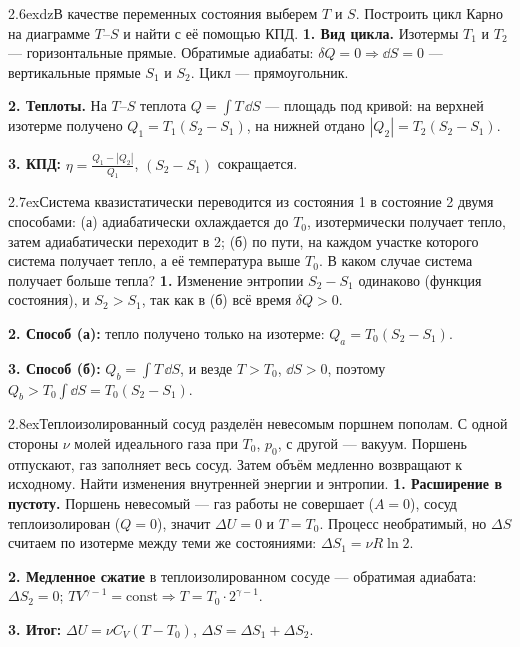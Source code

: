 \begin{problem}{2.6}{exdz}{В качестве переменных состояния выберем $T$ и $S$. Построить цикл Карно на диаграмме $T$--$S$ и найти с её помощью КПД.}
\textbf{1. Вид цикла.} Изотермы $T_1$ и $T_2$ — горизонтальные прямые. Обратимые адиабаты: $\delta Q=0\Rightarrow\dd S=0$ — вертикальные прямые $S_1$ и $S_2$.
Цикл — прямоугольник.

\textbf{2. Теплоты.} На $T$--$S$ теплота $Q=\int T\,\dd S$ — площадь под кривой:
на верхней изотерме получено $Q_1=T_1(S_2-S_1)$, на нижней отдано $|Q_2|=T_2(S_2-S_1)$.

\textbf{3. КПД:} $\eta=\frac{Q_1-|Q_2|}{Q_1}$, $(S_2-S_1)$ сокращается.
\end{problem}

\begin{problem}{2.7}{ex}{Система квазистатически переводится из состояния 1 в состояние 2 двумя способами: (а) адиабатически охлаждается до $T_0$,
изотермически получает тепло, затем адиабатически переходит в 2; (б) по пути, на каждом участке которого система получает тепло, а её температура выше $T_0$.
В каком случае система получает больше тепла?}
\textbf{1.} Изменение энтропии $S_2-S_1$ одинаково (функция состояния), и $S_2>S_1$, так как в (б) всё время $\delta Q>0$.

\textbf{2. Способ (а):} тепло получено только на изотерме: $Q_a=T_0(S_2-S_1)$.

\textbf{3. Способ (б):} $Q_b=\int T\,\dd S$, и везде $T>T_0$, $\dd S>0$, поэтому $Q_b>T_0\int\dd S=T_0(S_2-S_1)$.
\end{problem}

\begin{problem}{2.8}{ex}{Теплоизолированный сосуд разделён невесомым поршнем пополам. С одной стороны $\nu$ молей идеального газа при $T_0$, $p_0$,
с другой — вакуум. Поршень отпускают, газ заполняет весь сосуд. Затем объём медленно возвращают к исходному. Найти изменения внутренней энергии и энтропии.}
\textbf{1. Расширение в пустоту.} Поршень невесомый — газ работы не совершает ($A=0$), сосуд теплоизолирован ($Q=0$), значит $\Delta U=0$ и $T=T_0$.
Процесс необратимый, но $\Delta S$ считаем по изотерме между теми же состояниями: $\Delta S_1=\nu R\ln2$.

\textbf{2. Медленное сжатие} в теплоизолированном сосуде — обратимая адиабата: $\Delta S_2=0$;
$TV^{\gamma-1}=\text{const}\Rightarrow T=T_0\cdot2^{\gamma-1}$.

\textbf{3. Итог:} $\Delta U=\nu C_V(T-T_0)$, $\Delta S=\Delta S_1+\Delta S_2$.
\end{problem}

